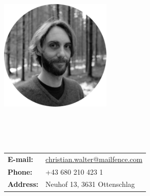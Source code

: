 
\begin{multicols}{2}

  \begingroup \centering \includegraphics[width=0.4\textwidth]{./figs/chris.jpg} \endgroup\\

  \vspace{0.5cm}

  \\

  \\\\
  \begin{tabular} { l l }
    \textbf{E-mail:} & \href{mailto:christian.walter@mailfence.com}{christian.walter@mailfence.com}\\
    \textbf{Phone:} & +43 680 210 423 1\\
    \textbf{Address:} & Neuhof 13, 3631 Ottenschlag\\
  \end{tabular}

\end{multicols}